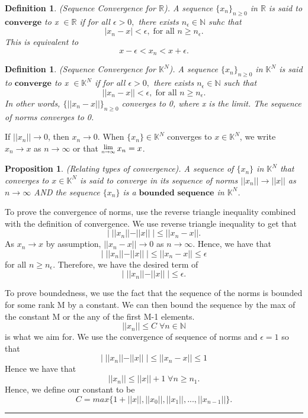 \documentclass[twoside]{article}
\newcommand{\Lim}[1]{\raisebox{0.5ex}{\scalebox{0.8}{$\displaystyle \lim_{#1}\;$}}}
\newtheorem{proposition}[theorem]{Proposition}
\newtheorem{definition}[theorem]{Definition}
\newenvironment{proof}{{\bf Proof:}}{\hfill\rule{2mm}{2mm}}
\newcommand{\seq}{\{x_n\}_{n \geq 0}}
\begin{document}
\begin{definition}
(Sequence Convergence for $\mathbb{R}$). A sequence $\seq$ in $\mathbb{R}$ is said to $\textbf{converge}$ to x $\in \mathbb{R}$ if for all $\epsilon > 0,$ there exists $n_{\epsilon} \in \mathbb{N}$ suhc that 
$$
|x_n - x| < \epsilon, \; \text{for all } n \geq n_{\epsilon}.
$$
This is equivalent to
$$
x - \epsilon < x_n < x + \epsilon.
$$
\end{definition}

\begin{definition}
(Sequence Convergence for $\mathbb{K}^N$). A sequence $\seq$ in $\mathbb{K}^N$ is said to $\textbf{converge}$ to x $\in \mathbb{K}^N$ if for all $\epsilon > 0,$ there exists $n_{\epsilon} \in \mathbb{N}$ such that 
$$
||x_n - x|| < \epsilon, \; \text{for all } n \geq n_{\epsilon}.
$$
In other words, $\{||x_n-x||\}_{n\geq0}$ converges to 0, where x is the limit. The sequence of norms converges to 0.
\end{definition}

If $||x_n|| \rightarrow 0$, then $x_n \rightarrow 0$. When $\{x_n\} \in \mathbb{K}^N$ converges to $x \in \mathbb{K}^N$, we write $x_n \rightarrow x$ as $n \rightarrow \infty$ or that $\Lim{n \rightarrow \infty}x_n = x$.

\begin{proposition}
(Relating types of convergence). A sequence of $\{x_n\}$ in $\mathbb{K}^N$ that converges to $x \in \mathbb{K}^N$ is said to converge in its sequence of norms $||x_n|| \rightarrow ||x||$ as $n \rightarrow \infty$ AND the sequence $\{x_n\}$ is a $\textbf{bounded sequence}$ in $\mathbb{K}^N$. 
\end{proposition}

\begin{proof}
To prove the convergence of norms, use the reverse triangle inequality combined with the definition of convergence. We use reverse triangle inequality to get that
$$
|\;||x_n|| - ||x||\;| \leq ||x_n - x||.
$$
As $x_n \rightarrow x$ by assumption, $||x_n - x|| \rightarrow 0$ as $n \rightarrow \infty$. Hence, we have that  
$$
|\;||x_n|| - ||x||\;| \leq ||x_n - x|| \leq \epsilon
$$
for all $n \geq n_{\epsilon}$. Therefore, we have the desired term of 
$$
|\;||x_n|| - ||x||\;| \leq \epsilon.
$$

To prove boundedness, we use the fact that the sequence of the norms is bounded for some rank M by a constant. We can then bound the sequence by the max of the constant M or the any of the first M-1 elements. 
$$
||x_n|| \leq C \; \forall n \in \mathbb{N}
$$
is what we aim for. We use the convergence of sequence of norms and $\epsilon = 1$ so that
$$
| \;||x_n|| - ||x||\;| \leq || x_n - x || \leq 1
$$
Hence we have that 
$$
||x_n|| \leq ||x|| + 1 \; \forall n \geq n_1.
$$
Hence, we define our constant to be
$$
C = max\{1 + ||x||, ||x_0||, ||x_1||, ... , ||x_{n-1}||\}.
$$
\end{proof}
\end{document}
